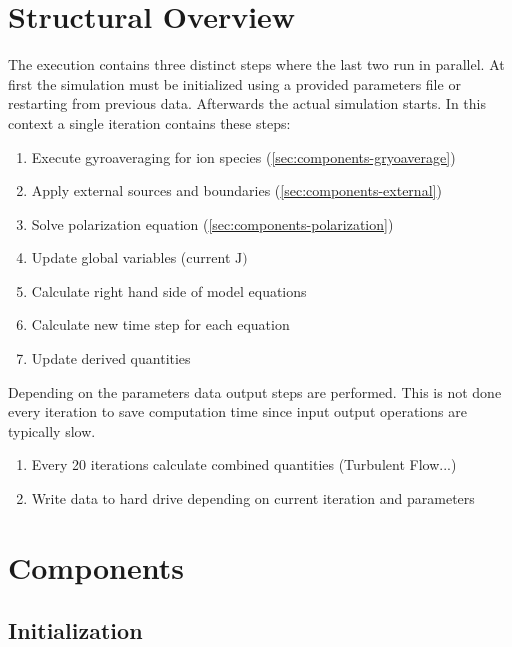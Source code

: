 \documentclass[master.tex]{subfiles}
\begin{document}
\section{Structural Overview}
The execution contains three distinct steps where the last two run in parallel. At first the simulation must be initialized using a provided parameters file or restarting from previous data. Afterwards the actual simulation starts. In this context a single iteration contains these steps:
\begin{enumerate}
    \item Execute gyroaveraging for ion species (\autoref{sec:components-gryoaverage})
    \item Apply external sources and boundaries (\autoref{sec:components-external})
    \item Solve polarization equation (\autoref{sec:components-polarization})
    \item Update global variables (current $\mathrm{J})$
    \item Calculate right hand side of model equations
    \item Calculate new time step for each equation
    \item Update derived quantities
\end{enumerate}
Depending on the parameters data output steps are performed. This is not done every iteration to save computation time since input output operations are typically slow.
\begin{enumerate}
    \item Every 20 iterations calculate combined quantities (Turbulent Flow...)
    \item Write data to hard drive depending on current iteration and parameters
\end{enumerate}
\section{Components}
\subsection{Initialization}
\end{document}
